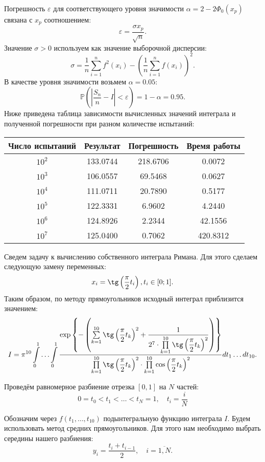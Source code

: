 Погрешность $ \varepsilon $ для соответствующего уровня значимости $ \alpha = 2 - 
 2\Phi_0(x_p)$ связана с $ x_p $ соотношением:
$$
\varepsilon = \dfrac{\sigma x_p}{\sqrt{n}}.
$$
Значение $ \sigma > 0 $ используем как значение выборочной дисперсии:
$$
\sigma = \frac{1}{n} \sum_{i = 1}^n f^2(x_i) - \left( \frac{1}{n}
 \sum_{i = 1}^n f(x_i) \right)^2.
$$
В качестве уровня значимости возьмем $ \alpha = 0.05 $:
$$
\mathbb{P} \left( \left| \dfrac{S_n}{n} - I \right| < \varepsilon \right) =
 1 - \alpha = 0.95.
$$
Ниже приведена таблица зависимости вычисленных значений интеграла и полученной
 погрешности при разном количестве испытаний:
\begin{center}
	\begin{tabular}{|c|c|c|c|}
		\hline
		Число испытаний & Результат & Погрешность&Время работы\\\hline
		$10^2$&133.0744&218.6706&0.0072\\\hline
		$10^3$&106.0557&69.5468&0.0627\\\hline
		$10^4$&111.0711&20.7890&0.5177\\\hline
		$10^5$&122.3331&6.9602&4.2440\\\hline
		$10^6$&124.8926&2.2344&42.1556 \\\hline
		$10^7$&125.0400&0.7062& 420.8312\\\hline
	\end{tabular}
\end{center}

Сведем задачу к вычислению собственного интеграла Римана. Для этого сделаем
 следующую замену переменных:
$$
x_i = \tg \left( \frac{\pi}{2} t_i \right), t_i \in [0; 1].
$$
Таким образом, по методу прямоугольников исходный интеграл приблизится значением:
$$
I = \pi^{10} \int\limits_{0}^{1} \ldots
 \int\limits_{0}^{1} \dfrac{\exp \left\lbrace - \left( \sum\limits_{k = 1}^{10}
 \tg \left( \dfrac{\pi}{2} t_k \right)^2 + \dfrac{1}{2^7 \cdot
 \prod\limits_{k = 1}^{10} \tg \left( \dfrac{\pi}{2} t_k \right)^2} \right)
 \right\rbrace}{\prod\limits_{k = 1}^{10} \tg \left( \dfrac{\pi}{2} t_k \right)^2
 \cdot\prod\limits_{k = 1}^{10} \cos \left( \dfrac{\pi}{2} t_k \right)^2} dt_1 
 \ldots dt_{10}.
$$

Проведём равномерное разбиение отрезка \( [0,1] \) на \( N \) частей:
\[
0 = t_0 < t_1 < \ldots < t_N = 1,\quad t_i = \dfrac{i}{N}
\]

Обозначим через \( f(t_1, \ldots, t_{10}) \) подынтегральную функцию интеграла
 \( I \). Будем использовать метод средних прямоугольников. Для этого нам
 необходимо выбрать середины нашего разбиения:
\[
y_i = \dfrac{t_i + t_{i - 1}}{2},\quad i = \overline{1,N}.
\]

